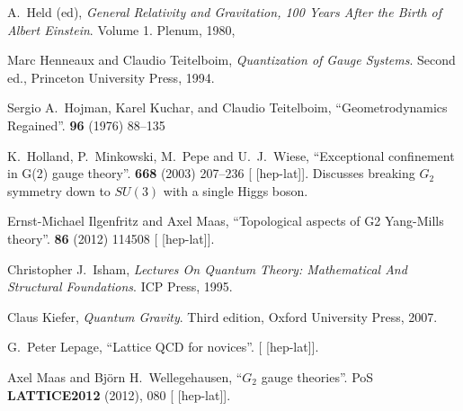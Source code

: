 \begin{thebibliography}{99}
A.~Held (ed),
\textit{General Relativity and Gravitation, 100 Years After the Birth of Albert Einstein}.
Volume 1.
Plenum, 1980,

Marc Henneaux and Claudio Teitelboim,
\textit{Quantization of Gauge Systems}.
Second ed., Princeton University Press, 1994.

Sergio A.~Hojman, Karel Kuchar, and Claudio Teitelboim,
``Geometrodynamics Regained''.
 \textbf{96} (1976) 88--135
{\tt{}}

K.~Holland, P.~Minkowski, M.~Pepe and U.~J.~Wiese,
``Exceptional confinement in G(2) gauge theory''.
 \textbf{668} (2003) 207--236
{\tt{}}
[ [hep-lat]].
Discusses breaking $G_{2}$ symmetry down to $SU(3)$ with a single Higgs boson.

Ernst-Michael Ilgenfritz and Axel Maas,
``Topological aspects of G2 Yang-Mills theory''.
 \textbf{86} (2012) 114508
{\tt{}}
[ [hep-lat]].

Christopher J.\ Isham,
\textit{Lectures On Quantum Theory: Mathematical And Structural Foundations}.
ICP Press, 1995.


Claus Kiefer,
\textit{Quantum Gravity}.
Third edition, Oxford University Press, 2007.



G.~Peter Lepage,
``Lattice QCD for novices''.
[ [hep-lat]].


Axel Maas and Bj\"{o}rn H.~Wellegehausen,
``$G_2$ gauge theories''.
PoS \textbf{LATTICE2012} (2012), 080
{\tt{}}
[ [hep-lat]].


\end{thebibliography}
